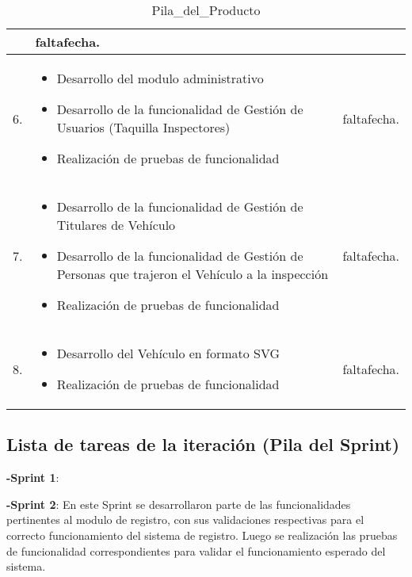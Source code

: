 \begin{table}[htb]
\begin{center}
\begin{tabular}{ | m{8cm} | m{8cm}| m{8cm}| }
 & faltafecha.\\
 \hline
 6. & 
 \begin{itemize}
 	\item Desarrollo del modulo administrativo
 	\item Desarrollo de la funcionalidad de Gestión de Usuarios (Taquilla Inspectores)
 	\item Realización de pruebas de funcionalidad
 \end{itemize}


 & faltafecha.\\
 \hline
 7. & 
 \begin{itemize}
 	\item Desarrollo de la funcionalidad de Gestión de Titulares de Vehículo
 	\item Desarrollo de la funcionalidad de Gestión de Personas que trajeron el Vehículo a la inspección
 	\item Realización de pruebas de funcionalidad
 \end{itemize}


 & faltafecha.\\
 \hline
 8. & 
 \begin{itemize}
 	\item Desarrollo del Vehículo en formato SVG
 	\item Realización de pruebas de funcionalidad
 \end{itemize}


 & faltafecha.\\
 \hline
\end{tabular}
\caption{Pila_del_Producto}
\label{Tabla:15}
\end{center}
\end{table}	



\setlength{\parskip}{0mm}


\subsection{Lista de tareas de la iteración (Pila del Sprint)}
\setlength{\parskip}{5mm}

\textbf{-Sprint 1}: 


\textbf{-Sprint 2}: En este Sprint se desarrollaron parte de las funcionalidades pertinentes al modulo de registro, con sus validaciones respectivas para el correcto funcionamiento del sistema de registro. Luego se realización las pruebas de funcionalidad correspondientes para validar el funcionamiento esperado del sistema.

